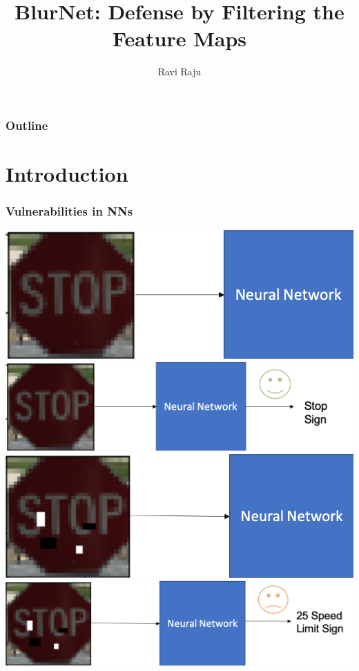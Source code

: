\documentclass{beamer}
\title{BlurNet: Defense by Filtering the Feature Maps}
\subtitle{Ravi Raju}
\begin{document}
\begin{frame}
	\titlepage
\end{frame}

\begin{frame}
\frametitle{Outline}
\tableofcontents
\end{frame}

\section{Introduction} %
\begin{frame}
\frametitle{Vulnerabilities in NNs}
\centering
{} {\includegraphics[scale=0.4]{clean_class1.png}\hspace{2.2cm}}
 {\includegraphics[scale=0.4]{cleanclassification2.png}}
 {\includegraphics[scale=0.4]{advclassification1.png}\hspace{2.2cm}}
 {\includegraphics[scale=0.4]{advclassification2.png}}
\end{frame}
\end{document}
